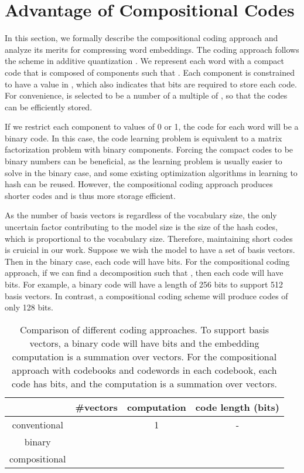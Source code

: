 \documentclass{article} \usepackage{iclr2018_conference_review,times}
\begin{document}
\section{Advantage of Compositional Codes}

In this section, we formally describe the compositional coding approach and analyze its merits for compressing word embeddings. The coding approach follows the scheme in additive quantization \citep{Babenko2014AdditiveQF}. We represent each word  with a compact code  that is composed of  components such that . Each component  is constrained to have a value in , which also indicates that  bits are required to store each code. For convenience,  is selected to be a number of a multiple of , so that the codes can be efficiently stored. 



If we restrict each component  to values of 0 or 1, the code for each word  will be a binary code. In this case, the code learning problem is equivalent to a matrix factorization problem with binary components. Forcing the compact codes to be binary numbers can be beneficial, as the learning problem is usually easier to solve in the binary case, and some existing optimization algorithms in learning to hash can be reused. However, the compositional coding approach produces shorter codes and is thus more storage efficient. 

As the number of basis vectors is  regardless of the vocabulary size, the only uncertain factor contributing to the model size is the size of the hash codes, which is proportional to the vocabulary size. Therefore, maintaining short codes is cruicial in our work. Suppose we wish the model to have a set of  basis vectors. Then in the binary case, each code will have  bits. For the compositional coding approach, if we can find a  decomposition such that , then each code will have  bits. For example, a binary code will have a length of 256 bits to support 512 basis vectors. In contrast, a  compositional coding scheme will produce codes of only 128 bits.




\begin{table}[h]
\begin{center}
    \begin{tabular}{c|c|c|c}
    \hline \hline
    & {\bf \#vectors} & {\bf computation} & {\bf code length (bits)} \\
    \hline
    conventional &  & 1 & - \\
    \hline
    binary &  &  &  \\
    compositional &  &  &  \\
    \hline \hline
    \end{tabular}
    \caption{Comparison of different coding approaches. To support  basis vectors, a binary code will have  bits and the embedding computation is a summation over  vectors. For the compositional approach with  codebooks and  codewords in each codebook, each code has  bits, and the computation is a summation over  vectors.}
    \label{table:compare}
\end{center}
\end{table}
\end{document}

